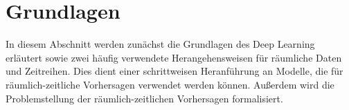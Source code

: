 \section{Grundlagen}
\label{sec:Grundlagen}

In diesem Abschnitt werden zunächst die Grundlagen des Deep Learning erläutert sowie zwei häufig verwendete Herangehensweisen für räumliche Daten und Zeitreihen.
Dies dient einer schrittweisen Heranführung an Modelle, die für räumlich-zeitliche Vorhersagen verwendet werden können.
Außerdem wird die Problemstellung der räumlich-zeitlichen Vorhersagen formalisiert.









